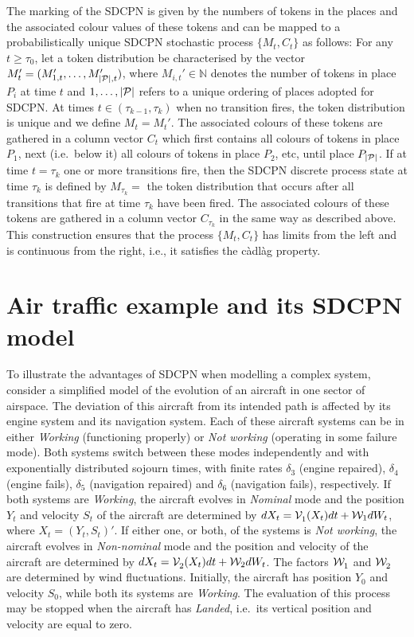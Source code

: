 \documentclass[copyright,creativecommons]{eptcs}
\begin{document}
The marking of the SDCPN is given by the numbers of tokens in the
places and the associated colour values of these tokens and can be
mapped to a probabilistically unique SDCPN stochastic process
$\{M_t,C_t\}$ as follows: For any $t \geq \tau_0$, let a token
distribution be characterised by the vector $M_t' = (M_{1,t}',
\ldots, M_{|{\cal P}|,t}')$, where $M_{i,t}' \in \mathbb{N}$
denotes the number of tokens in place $P_i$ at time $t$ and $1,
\ldots ,|{\cal P}|$ refers to a unique ordering of places adopted
for SDCPN. At times $t \in (\tau_{k-1},\tau_k)$ when no transition
fires, the token distribution is unique and we define $M_t = M_t
'$. The associated colours of these tokens are gathered in a
column vector $C_t$ which first contains all colours of tokens in
place $P_1$, next (i.e.\ below it) all colours of tokens in place
$P_2$, etc, until place $P_{|{\cal P}|}$. If at time $t=\tau_k$
one or more transitions fire, then the SDCPN discrete process
state at time ${\tau_k}$ is defined by $M_{\tau_k} = $ the token
distribution that occurs after all transitions that fire at time
${\tau_k}$ have been fired. The associated colours of these tokens
are gathered in a column vector $C_{\tau_k}$ in the same way as
described above. This construction ensures that the process
$\{M_t, C_t\}$ has limits from the left and is continuous from the
right, i.e., it satisfies the c\`adl\`ag property.


\section{Air traffic example and its SDCPN model}\label{sec:airtrafficSDCPN}
To illustrate the advantages of SDCPN when modelling a complex
system, consider a simplified model of the evolution of an
aircraft in one sector of airspace. The deviation of this aircraft
from its intended path is affected by its engine system and its
navigation system. Each of these aircraft systems can be in either
{\em Working} (functioning properly) or {\em Not working}
(operating in some failure mode). Both systems switch between
these modes independently and with exponentially distributed
sojourn times, with finite rates $\delta_3$ (engine repaired),
$\delta_4$ (engine fails), $\delta_5$ (navigation repaired) and
$\delta_6$ (navigation fails), respectively. If both systems are
{\em Working}, the aircraft evolves in {\em Nominal} mode and the
position $Y_t$ and velocity $S_t$ of the aircraft are determined
by $dX_t = {\cal V}_1^{}(X_t)dt + {\cal W}_1 dW_t$, where $X_t =
(Y_t, S_t)'$. If either one, or both, of the systems is {\em Not
working}, the aircraft evolves in {\em Non-nominal} mode and the
position and velocity of the aircraft are determined by $dX_t =
{\cal V}_2^{}(X_t)dt + {\cal W}_2 dW_t$. The factors ${\cal
W}_1^{}$ and ${\cal W}_2^{}$ are determined by wind fluctuations.
Initially, the aircraft has position $Y_0$ and velocity $S_0$,
while both its systems are {\em Working}. The evaluation of this
process may be stopped when the aircraft has {\em Landed}, i.e.\
its vertical position and velocity are equal to zero.
\end{document}
